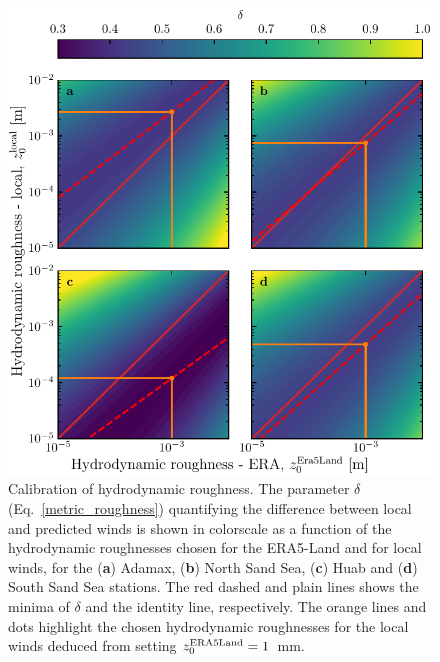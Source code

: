 \begin{figure}[p]
\centering
\includegraphics[scale=1]{Figures/Figure4_supp.pdf}
\caption{Calibration of hydrodynamic roughness. The parameter $\delta$ (Eq.~\ref{metric_roughness}) quantifying the difference between local and predicted winds is shown in colorscale as a function of the hydrodynamic roughnesses chosen for the ERA5-Land and for local winds, for the (\textbf{a}) Adamax, (\textbf{b}) North Sand Sea, (\textbf{c}) Huab and (\textbf{d}) South Sand Sea stations. The red dashed and plain lines shows the minima of $\delta$ and the identity line, respectively. The orange lines and dots highlight the chosen hydrodynamic roughnesses for the local winds deduced from setting $z_{0}^{\textup{ERA5Land}} = 1$~mm.}
\label{Fig4_supp}
\end{figure}

